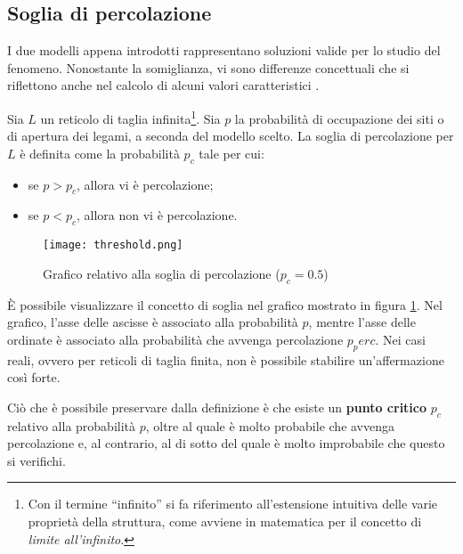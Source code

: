 \subsection*{Soglia di percolazione}
I due modelli appena introdotti rappresentano soluzioni valide per lo studio 
del fenomeno. Nonostante la somiglianza, vi sono differenze concettuali che si 
riflettono anche nel calcolo di alcuni valori caratteristici \cite{weisstein-bond,weisstein-site,weisstein-threshold}.

\begin{definition}
    Sia $L$ un reticolo di taglia infinita\footnote{Con il termine ``infinito'' 
    si fa riferimento all'estensione intuitiva delle varie proprietà della struttura,
    come avviene in matematica per il concetto di \textit{limite all'infinito}.}. 
    Sia $p$ la probabilità di occupazione dei siti o di apertura 
    dei legami, a seconda del modello scelto.
    La soglia di percolazione per $L$ è definita come la 
    probabilità $p_c$ tale per cui:
    \begin{itemize}
        \item se $p > p_c$, allora vi è percolazione;
        \item se $p < p_c$, allora non vi è percolazione.
    \end{itemize}
\end{definition}

\begin{figure}
    \centering
    \texttt{[image: threshold.png]}
    \caption{Grafico relativo alla soglia di percolazione ($p_c=0.5$)}
    \label{fig:threshold}
\end{figure}

È possibile visualizzare il concetto di soglia nel grafico mostrato in 
figura \ref{fig:threshold}. Nel grafico, l'asse delle ascisse è associato alla 
probabilità $p$, mentre l'asse delle ordinate è associato alla probabilità
che avvenga percolazione $p_perc$.
Nei casi reali, ovvero per reticoli di taglia finita, non è possibile stabilire
un'affermazione così forte. 

Ciò che è possibile preservare dalla definizione 
è che esiste un \textbf{punto critico} $p_c$ relativo alla probabilità $p$, oltre 
al quale è molto probabile che avvenga percolazione e, al contrario, al di sotto
del quale è molto improbabile che questo si verifichi.

